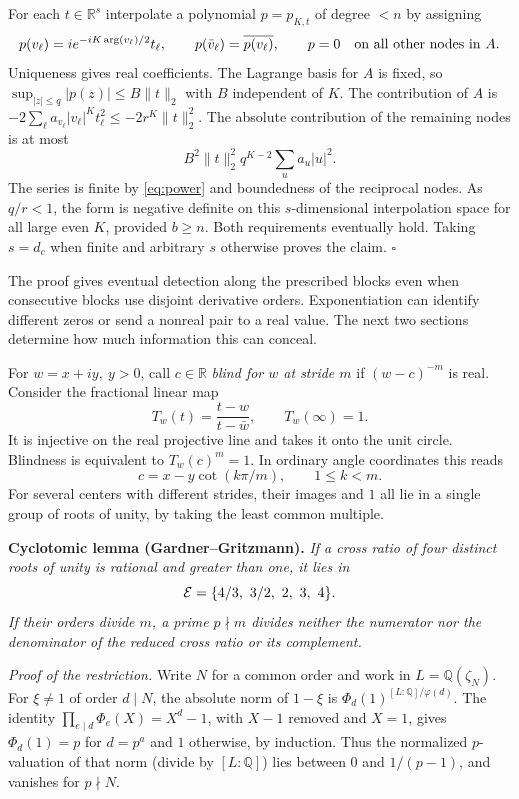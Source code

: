 \documentclass[11pt,letterpaper]{article}
\newcommand{\Q}{\mathbb Q}\newcommand{\R}{\mathbb R}\newcommand{\C}{\mathbb C}
\newcommand{\heading}[1]{\medskip\noindent{\large\bfseries\color{ink}#1}\par}
\newcommand{\thm}[2]{\noindent\textbf{\color{accent}#1.} \textit{#2}\par}
\begin{document}
For each \(t\in\R^s\) interpolate a polynomial \(p=p_{K,t}\) of degree \(<n\) by assigning
\[
 p(v_\ell)=i e^{-iK\arg(v_\ell)/2}t_\ell,\qquad
 p(\bar v_\ell)=\overline{p(v_\ell)},\qquad
 p=0\quad\hbox{on all other nodes in }A .
\]
Uniqueness gives real coefficients. The Lagrange basis for \(A\) is fixed, so \(\sup_{|z|\le q}|p(z)|\le B\|t\|_2\) with \(B\) independent of \(K\). The contribution of \(A\) is \(-2\sum_\ell a_{v_\ell}|v_\ell|^K t_\ell^2\le-2r^K\|t\|_2^2\). The absolute contribution of the remaining nodes is at most
\[
 B^2\|t\|_2^2 q^{K-2}\sum_u a_u |u|^2 .
\]
The series is finite by \eqref{eq:power} and boundedness of the reciprocal nodes. As \(q/r<1\), the form is negative definite on this \(s\)-dimensional interpolation space for all large even \(K\), provided \(b\ge n\). Both requirements eventually hold. Taking \(s=d_c\) when finite and arbitrary \(s\) otherwise proves the claim. \hfill\(\square\)

The proof gives eventual detection along the prescribed blocks even when consecutive blocks use disjoint derivative orders. Exponentiation can identify different zeros or send a nonreal pair to a real value. The next two sections determine how much information this can conceal.

\newpage
\heading{3. Rational centers at which a pair is invisible}
For \(w=x+iy,\ y>0\), call \(c\in\R\) \emph{blind for \(w\) at stride \(m\)} if \((w-c)^{-m}\) is real. Consider the fractional linear map
\[
 T_w(t)=\frac{t-w}{t-\bar w},\qquad T_w(\infty)=1.
\]
It is injective on the real projective line and takes it onto the unit circle. Blindness is equivalent to \(T_w(c)^m=1\). In ordinary angle coordinates this reads
\begin{equation}
 c=x-y\cot(k\pi/m),\qquad 1\le k<m.                       \label{eq:cot}
\end{equation}
For several centers with different strides, their images and \(1\) all lie in a single group of roots of unity, by taking the least common multiple.

\thm{Cyclotomic lemma (Gardner--Gritzmann)}{If a cross ratio of four distinct roots of unity is rational and greater than one, it lies in
\[
 \E=\{4/3,\ 3/2,\ 2,\ 3,\ 4\}.
\]
If their orders divide \(m\), a prime \(p\nmid m\) divides neither the numerator nor the denominator of the reduced cross ratio or its complement.}

\textit{Proof of the restriction.} Write \(N\) for a common order and work in \(L=\Q(\zeta_N)\). For \(\xi\ne1\) of order \(d\mid N\), the absolute norm of \(1-\xi\) is \(\Phi_d(1)^{[L:\Q]/\varphi(d)}\). The identity \(\prod_{e\mid d}\Phi_e(X)=X^d-1\), with \(X-1\) removed and \(X=1\), gives \(\Phi_d(1)=p\) for \(d=p^a\) and \(1\) otherwise, by induction. Thus the normalized \(p\)-valuation of that norm (divide by \([L:\Q]\)) lies between 0 and \(1/(p-1)\), and vanishes for \(p\nmid N\).
\end{document}

